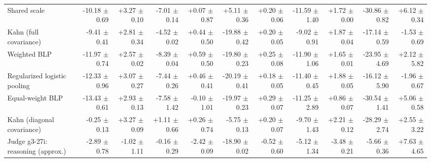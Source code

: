 \begin{tabular}{lrrrrrrrrrr}
Shared scale & -10.18 {\scriptsize $\pm$ 0.69} & +3.27 {\scriptsize $\pm$ 0.10} & -7.01 {\scriptsize $\pm$ 0.14} & +0.07 {\scriptsize $\pm$ 0.87} & +5.11 {\scriptsize $\pm$ 0.36} & +0.20 {\scriptsize $\pm$ 0.06} & -11.59 {\scriptsize $\pm$ 1.40} & +1.72 {\scriptsize $\pm$ 0.00} & -30.86 {\scriptsize $\pm$ 0.82} & +6.12 {\scriptsize $\pm$ 0.34} \\
Kahn (full covariance) & -9.41 {\scriptsize $\pm$ 0.41} & +2.81 {\scriptsize $\pm$ 0.34} & -4.52 {\scriptsize $\pm$ 0.02} & +0.44 {\scriptsize $\pm$ 0.50} & -19.88 {\scriptsize $\pm$ 0.42} & +0.20 {\scriptsize $\pm$ 0.05} & -9.02 {\scriptsize $\pm$ 0.91} & +1.87 {\scriptsize $\pm$ 0.04} & -17.14 {\scriptsize $\pm$ 0.59} & -1.53 {\scriptsize $\pm$ 0.69} \\
Weighted BLP & -11.97 {\scriptsize $\pm$ 0.74} & +2.57 {\scriptsize $\pm$ 0.02} & -8.39 {\scriptsize $\pm$ 0.04} & +0.59 {\scriptsize $\pm$ 0.50} & -19.80 {\scriptsize $\pm$ 0.23} & +0.25 {\scriptsize $\pm$ 0.08} & -11.90 {\scriptsize $\pm$ 1.06} & +1.65 {\scriptsize $\pm$ 0.01} & -23.95 {\scriptsize $\pm$ 4.69} & +2.12 {\scriptsize $\pm$ 5.82} \\
Regularized logistic pooling & -12.33 {\scriptsize $\pm$ 0.96} & +3.07 {\scriptsize $\pm$ 0.27} & -7.44 {\scriptsize $\pm$ 0.26} & +0.46 {\scriptsize $\pm$ 0.41} & -20.19 {\scriptsize $\pm$ 0.41} & +0.18 {\scriptsize $\pm$ 0.05} & -11.40 {\scriptsize $\pm$ 0.45} & +1.88 {\scriptsize $\pm$ 0.05} & -16.12 {\scriptsize $\pm$ 5.90} & -1.96 {\scriptsize $\pm$ 0.67} \\
Equal-weight BLP & -13.43 {\scriptsize $\pm$ 0.61} & +2.93 {\scriptsize $\pm$ 0.13} & -7.58 {\scriptsize $\pm$ 1.42} & -0.10 {\scriptsize $\pm$ 1.01} & -19.97 {\scriptsize $\pm$ 0.23} & +0.29 {\scriptsize $\pm$ 0.07} & -11.25 {\scriptsize $\pm$ 2.89} & +0.86 {\scriptsize $\pm$ 0.07} & -30.54 {\scriptsize $\pm$ 1.41} & +5.06 {\scriptsize $\pm$ 0.58} \\
Kahn (diagonal covariance) & -0.25 {\scriptsize $\pm$ 0.13} & +3.27 {\scriptsize $\pm$ 0.09} & +1.11 {\scriptsize $\pm$ 0.66} & +0.26 {\scriptsize $\pm$ 0.74} & -5.75 {\scriptsize $\pm$ 0.13} & +0.20 {\scriptsize $\pm$ 0.07} & -9.70 {\scriptsize $\pm$ 1.43} & +2.21 {\scriptsize $\pm$ 0.12} & -28.29 {\scriptsize $\pm$ 2.74} & +2.55 {\scriptsize $\pm$ 3.22} \\
Judge g3-27i: reasoning (approx.) & -2.89 {\scriptsize $\pm$ 0.78} & -1.02 {\scriptsize $\pm$ 1.11} & -0.16 {\scriptsize $\pm$ 0.29} & -2.42 {\scriptsize $\pm$ 0.09} & -18.90 {\scriptsize $\pm$ 0.02} & -0.52 {\scriptsize $\pm$ 0.60} & -5.12 {\scriptsize $\pm$ 1.34} & -3.48 {\scriptsize $\pm$ 0.21} & -5.66 {\scriptsize $\pm$ 0.36} & +7.63 {\scriptsize $\pm$ 4.65} \\

\end{tabular}
